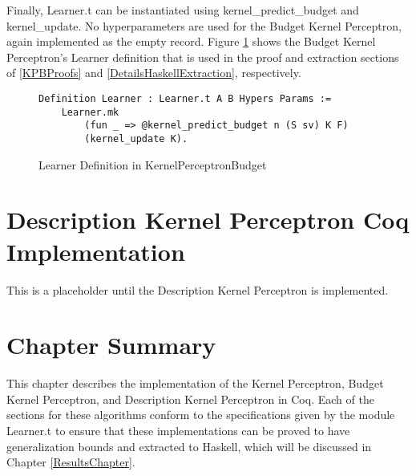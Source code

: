 Finally, Learner.t can be instantiated using kernel\_predict\_budget and kernel\_update. No hyperparameters are used for the Budget Kernel Perceptron, again implemented as the empty record. Figure \ref{kpbLearnerDef} shows the Budget Kernel Perceptron's Learner definition that is used in the proof and extraction sections of \ref{KPBProofs} and \ref{DetailsHaskellExtraction}, respectively.

\begin{figure}
    \caption{Learner Definition in KernelPerceptronBudget}
    \label{kpbLearnerDef}
    \begin{lstlisting}
Definition Learner : Learner.t A B Hypers Params :=
    Learner.mk
        (fun _ => @kernel_predict_budget n (S sv) K F)
        (kernel_update K).
    \end{lstlisting}
\end{figure}

\section{Description Kernel Perceptron Coq Implementation}\label{KPDCoqImp}
This is a placeholder until the Description Kernel Perceptron is implemented.
\section{Chapter Summary}\label{MethodsChapterSummarySection}
This chapter describes the implementation of the Kernel Perceptron, Budget Kernel Perceptron, and Description Kernel Perceptron in Coq. Each of the sections for these algorithms conform to the specifications given by the module Learner.t to ensure that these implementations can be proved to have generalization bounds and extracted to Haskell, which will be discussed in Chapter \ref{ResultsChapter}. 
